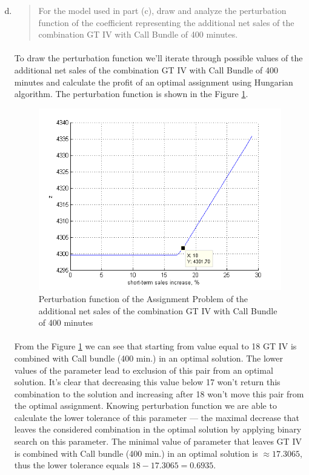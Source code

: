 \begin{enumerate}[(a)]
\setcounter{enumi}{3}
\item\begin{quote}For the model used in part (c), draw and analyze the perturbation function of the
coefficient representing the additional net sales of the combination GT IV with
Call Bundle of 400 minutes.\end{quote}

	\paragraph{}
	To draw the perturbation function we'll iterate through possible values of the additional net sales of the combination GT IV with
Call Bundle of 400 minutes and calculate the profit of an optimal assignment using Hungarian algorithm. The perturbation function is shown in the Figure \ref{perturbation-5-d}.

\begin{figure}[H]
	\centering
	\includegraphics[scale=1]{./img/perturbation-5-d.png}
	\caption{Perturbation function of the Assignment Problem of the additional net sales of the combination GT IV with Call Bundle of 400 minutes}
	\label{perturbation-5-d}
\end{figure}

	\paragraph{}
	From the Figure \ref{perturbation-5-d} we can see that starting from value equal to 18 GT IV is combined with Call bundle (400 min.) in an optimal solution. The lower values of the parameter lead to exclusion of this pair from an optimal solution. It's clear that decreasing this value below 17 won't return this combination to the solution and increasing after 18 won't move this pair from the optimal assignment. Knowing perturbation function we are able to calculate the lower tolerance of this parameter --- the maximal decrease that leaves the considered combination in the optimal solution by applying binary search on this parameter. The minimal value of parameter that leaves GT IV is combined with Call bundle (400 min.) in an optimal solution is $\approx17.3065$, thus the lower tolerance equals $18-17.3065=0.6935$.


\end{enumerate}
